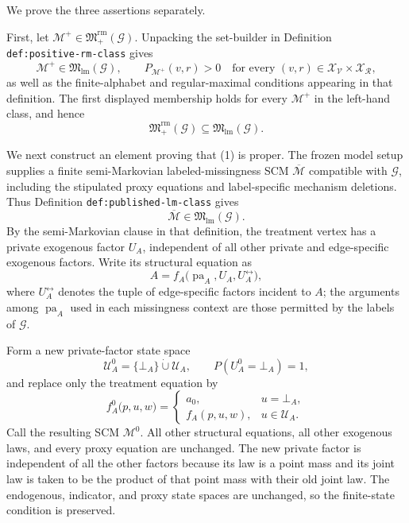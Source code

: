 We prove the three assertions separately.

First, let \(\mathcal M^{+}\in\mathfrak M_{+}^{\mathrm{rm}}(\mathcal G)\).  Unpacking the set-builder in Definition \texttt{def:positive-rm-class} gives
\[
\mathcal M^{+}\in\mathfrak M_{\mathrm{lm}}(\mathcal G),
\qquad
P_{\mathcal M^{+}}(v,r)>0
\quad\text{for every }(v,r)\in
\mathcal X_{\mathcal V}\times\mathcal X_{\mathcal R},
\]
as well as the finite-alphabet and regular-maximal conditions appearing in that definition.  The first displayed membership holds for every \(\mathcal M^{+}\) in the left-hand class, and hence
\[
\mathfrak M_{+}^{\mathrm{rm}}(\mathcal G)
\subseteq
\mathfrak M_{\mathrm{lm}}(\mathcal G).
\tag{1}
\]

We next construct an element proving that (1) is proper.  The frozen model setup supplies a finite semi-Markovian labeled-missingness SCM \(\overline{\mathcal M}\) compatible with \(\mathcal G\), including the stipulated proxy equations and label-specific mechanism deletions.  Thus Definition \texttt{def:published-lm-class} gives
\[
\overline{\mathcal M}\in\mathfrak M_{\mathrm{lm}}(\mathcal G).
\tag{2}
\]
By the semi-Markovian clause in that definition, the treatment vertex has a private exogenous factor \(U_A\), independent of all other private and edge-specific exogenous factors.  Write its structural equation as
\[
A=f_A\bigl(\operatorname{pa}_A,U_A,U_A^{\leftrightarrow}\bigr),
\]
where \(U_A^{\leftrightarrow}\) denotes the tuple of edge-specific factors incident to \(A\); the arguments among \(\operatorname{pa}_A\) used in each missingness context are those permitted by the labels of \(\mathcal G\).

Form a new private-factor state space
\[
\mathcal U_A^{0}=\{\bot_A\}\mathbin{\dot\cup}\mathcal U_A,
\qquad
P(U_A^{0}=\bot_A)=1,
\]
and replace only the treatment equation by
\[
f_A^{0}\bigl(p,u,w\bigr)
=
\begin{cases}
a_0,&u=\bot_A,\\
f_A(p,u,w),&u\in\mathcal U_A.
\end{cases}
\tag{3}
\]
Call the resulting SCM \(\mathcal M^{0}\).  All other structural equations, all other exogenous laws, and every proxy equation are unchanged.  The new private factor is independent of all the other factors because its law is a point mass and its joint law is taken to be the product of that point mass with their old joint law.  The endogenous, indicator, and proxy state spaces are unchanged, so the finite-state condition is preserved.

